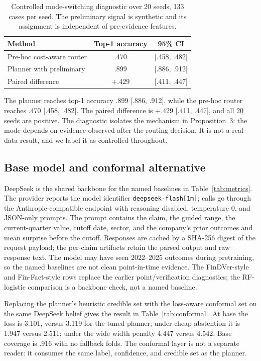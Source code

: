 \documentclass[11pt]{article}
\begin{document}
\begin{table}[t]
\centering
\small
\setlength{\tabcolsep}{4pt}
\begin{tabular}{lcc}
\toprule
Method & Top-1 accuracy & 95\% CI \\
\midrule
Pre-hoc cost-aware router & .470 & [.458, .482] \\
Planner with preliminary & .899 & [.886, .912] \\
Paired difference & +.429 & [.411, .447] \\
\bottomrule
\end{tabular}
\caption{Controlled mode-switching diagnostic over 20 seeds, 133 cases per seed. The preliminary signal is synthetic and its assignment is independent of pre-evidence features.}
\label{tab:controlled}
\end{table}

The planner reaches top-1 accuracy .899 [.886, .912], while the pre-hoc router reaches .470 [.458, .482]. The paired difference is +.429 [.411, .447], and all 20 seeds are positive. The diagnostic isolates the mechanism in Proposition~3: the mode depends on evidence observed after the routing decision. It is not a real-data result, and we label it as controlled throughout.

\subsection{Base model and conformal alternative}
\label{app:deepseek}
DeepSeek is the shared backbone for the named baselines in
Table~\ref{tab:metrics}. The provider reports the model identifier
\texttt{deepseek-flash[1m]}; calls go through the Anthropic-compatible endpoint
with reasoning disabled, temperature 0, and JSON-only prompts. The prompt
contains the claim, the guided range, the current-quarter value, cutoff date,
sector, and the company's prior outcomes and mean surprise before the cutoff.
Responses are cached by a SHA-256 digest of the request payload; the per-claim
artifacts retain the parsed output and raw response text. The model may have
seen 2022--2025 outcomes during pretraining, so the named baselines are not
clean point-in-time evidence. The FinDVer-style and Fin-Fact-style rows replace
the earlier point/verification diagnostics; the RF-logistic comparison is a
backbone check, not a named baseline.

Replacing the planner's heuristic credible set with the loss-aware conformal
set on the same DeepSeek belief gives the result in
Table~\ref{tab:conformal}. At base the loss is 3.101, versus 3.119 for the
tuned planner; under cheap abstention it is 1.947 versus 2.511; under the wide
width penalty 4.447 versus 4.542. Base coverage is .916 with no fallback
folds. The conformal layer is not a separate reader: it consumes the same
label, confidence, and credible set as the planner.
\end{document}
